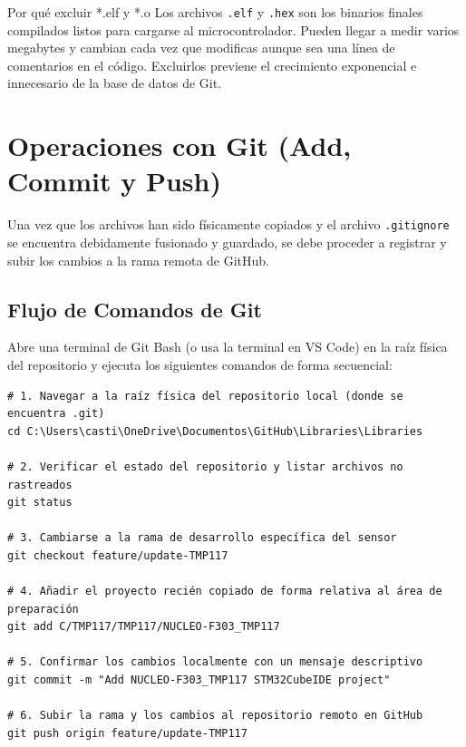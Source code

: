 \documentclass[
10pt, %
a4paper, %
oneside, %
headinclude,footinclude, %
BCOR5mm, %
]{scrartcl}
\begin{document}
\begin{WarningBox}{Por qué excluir *.elf y *.o}
	Los archivos \texttt{.elf} y \texttt{.hex} son los binarios finales compilados listos para cargarse al microcontrolador. Pueden llegar a medir varios megabytes y cambian cada vez que modificas aunque sea una línea de comentarios en el código. Excluirlos previene el crecimiento exponencial e innecesario de la base de datos de Git.
\end{WarningBox}

\newpage
\section{Operaciones con Git (Add, Commit y Push)}

Una vez que los archivos han sido físicamente copiados y el archivo \texttt{.gitignore} se encuentra debidamente fusionado y guardado, se debe proceder a registrar y subir los cambios a la rama remota de GitHub.

\subsection{Flujo de Comandos de Git}
Abre una terminal de Git Bash (o usa la terminal en VS Code) en la raíz física del repositorio y ejecuta los siguientes comandos de forma secuencial:

\begin{lstlisting}[language=DOS]
# 1. Navegar a la raíz física del repositorio local (donde se encuentra .git)
cd C:\Users\casti\OneDrive\Documentos\GitHub\Libraries\Libraries

# 2. Verificar el estado del repositorio y listar archivos no rastreados
git status

# 3. Cambiarse a la rama de desarrollo específica del sensor
git checkout feature/update-TMP117

# 4. Añadir el proyecto recién copiado de forma relativa al área de preparación
git add C/TMP117/TMP117/NUCLEO-F303_TMP117

# 5. Confirmar los cambios localmente con un mensaje descriptivo
git commit -m "Add NUCLEO-F303_TMP117 STM32CubeIDE project"

# 6. Subir la rama y los cambios al repositorio remoto en GitHub
git push origin feature/update-TMP117
\end{lstlisting}
\end{document}
